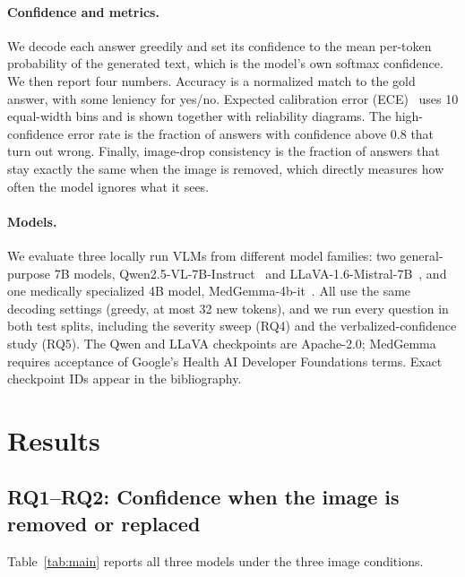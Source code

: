 \documentclass{article}
\begin{document}
\paragraph{Confidence and metrics.} We decode each answer greedily and set its
confidence to the mean per-token probability of the generated text, which is the
model's own softmax confidence. We then report four numbers. Accuracy is a
normalized match to the gold answer, with some leniency for yes/no. Expected
calibration error (ECE)~\cite{guo_calibration} uses 10 equal-width bins and is
shown together with reliability diagrams. The high-confidence error rate is the fraction of answers
with confidence above 0.8 that turn out wrong. Finally, image-drop consistency is
the fraction of answers that stay exactly the same when the image is removed, which
directly measures how often the model ignores what it sees.

\paragraph{Models.} We evaluate three locally run VLMs from different model families: two
general-purpose 7B models, Qwen2.5-VL-7B-Instruct~\cite{qwen25vl} and
LLaVA-1.6-Mistral-7B~\cite{llava16}, and one medically specialized 4B model,
MedGemma-4b-it~\cite{medgemma}. All use the same decoding settings (greedy, at most
32 new tokens), and we run every question in both test splits, including the
severity sweep (RQ4) and the verbalized-confidence study (RQ5). The Qwen and LLaVA
checkpoints are Apache-2.0; MedGemma requires acceptance of Google's Health AI
Developer Foundations terms. Exact checkpoint IDs appear in the bibliography.

\section{Results}

\subsection{RQ1--RQ2: Confidence when the image is removed or replaced}
Table~\ref{tab:main} reports all three models under the three image conditions.
\end{document}
